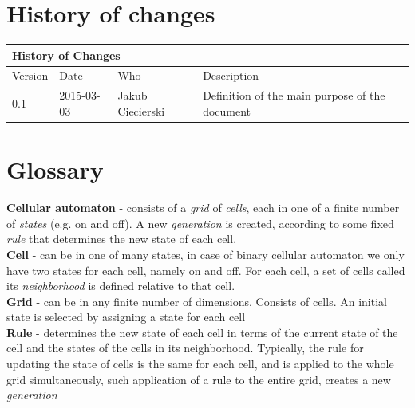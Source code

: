 \documentclass{article}
\begin{document}
\section{History of changes}

\begin{table}[h]
\hspace*{-2.1cm}
\large
\begin{tabular}{|l|l|l|l|}
\hline
\multicolumn{4}{|l|}{\cellcolor[HTML]{C0C0C0}History of Changes} \\ \hline
Version         & Date         & Who        & Description        \\ \hline
0.1         & 2015-03-03         & Jakub Ciecierski        & Definition of the main purpose of the document       \\ \hline
\end{tabular}
\end{table}

\newpage
\section{Glossary} \par


\setlength{\parindent}{5ex}
\Large {\bf \hspace{15pt} Cellular automaton } - consists of a \textit{grid} of \textit{cells}, each in one of a finite number of \textit{states} (e.g. on and off). 
	A new \textit{generation} is created, according to some fixed
	\textit{rule} that determines the new state of each cell. \\


\Large {\bf 
	Cell 
}	
	- can be in one of many states,
	in case of binary cellular automaton we only have two states for each cell, namely on and off.
	For each cell, a set of cells called its
	\textit{neighborhood} is defined relative to that cell.	\\


\Large {\bf 
	Grid
} 	
	- can be in any finite number of dimensions. Consists of cells.
	An initial state is selected by assigning a state for each cell \\


\Large {\bf Rule
} 
	- determines the new state of each cell in terms of the current state
	of the cell and the states of the cells in its neighborhood.
	Typically, the rule for updating the state of cells is the same for each
	cell, and is applied to the whole grid simultaneously, such application of
	a rule to the entire grid, creates a new \textit{generation} \\
\end{document}
